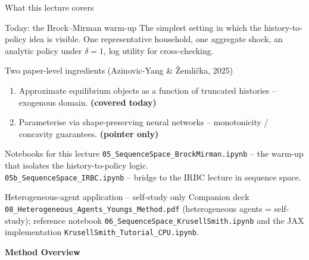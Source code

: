 \documentclass[aspectratio=169,11pt]{beamer}
\newcommand{\emphc}[1]{\textcolor{harvardcrimson}{#1}}
\begin{document}
\begin{frame}{What this lecture covers}
\small
\begin{block}{Today: the Brock--Mirman warm-up}
The simplest setting in which the history-to-policy idea is visible. One representative household, one aggregate shock, an analytic policy under $\delta=1$, log utility for cross-checking.
\end{block}

\begin{block}{Two paper-level ingredients (Azinovic-Yang \& \v{Z}emli\v{c}ka, 2025)}
\begin{enumerate}\itemsep1pt
    \item Approximate equilibrium objects as a function of \emphc{truncated histories} -- exogenous domain. \;\textbf{(covered today)}
    \item Parameterise via \emphc{shape-preserving neural networks} -- monotonicity / concavity guarantees. \;\textbf{(pointer only)}
\end{enumerate}
\end{block}

\begin{block}{Notebooks for this lecture}
\texttt{05\_SequenceSpace\_BrockMirman.ipynb} -- the warm-up that isolates the history-to-policy logic.\\
\texttt{05b\_SequenceSpace\_IRBC.ipynb} -- bridge to the IRBC lecture in sequence space.
\end{block}

\begin{block}{Heterogeneous-agent application -- self-study only}
Companion deck \texttt{08\_Heterogeneous\_Agents\_Youngs\_Method.pdf} (heterogeneous agents = self-study); reference notebook \texttt{06\_SequenceSpace\_KrusellSmith.ipynb} and the JAX implementation \texttt{KrusellSmith\_Tutorial\_CPU.ipynb}.
\end{block}
\end{frame}



\begin{frame}{}
\centering\vspace{2.0cm}
{\Huge\color{uzhblue}\textbf{Method Overview}}
\end{frame}
\end{document}
